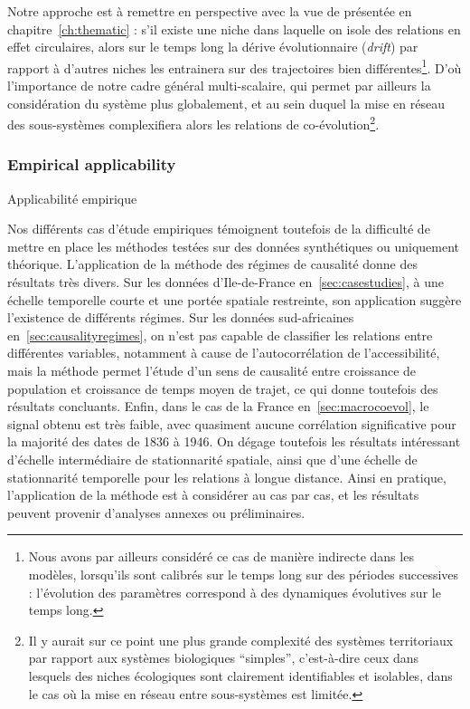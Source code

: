 Notre approche est à remettre en perspective avec la vue de  présentée en chapitre~\ref{ch:thematic} : s'il existe une niche dans laquelle on isole des relations en effet circulaires, alors sur le temps long la dérive évolutionnaire (\emph{drift}) par rapport à d'autres niches les entrainera sur des trajectoires bien différentes\footnote{Nous avons par ailleurs considéré ce cas de manière indirecte dans les modèles, lorsqu'ils sont calibrés sur le temps long sur des périodes successives : l'évolution des paramètres correspond à des dynamiques évolutives sur le temps long.}. D'où l'importance de notre cadre général multi-scalaire, qui permet par ailleurs la considération du système plus globalement, et au sein duquel la mise en réseau des sous-systèmes complexifiera alors les relations de co-évolution\footnote{Il y aurait sur ce point une plus grande complexité des systèmes territoriaux par rapport aux systèmes biologiques ``simples'', c'est-à-dire ceux dans lesquels des niches écologiques sont clairement identifiables et isolables, dans le cas où la mise en réseau entre sous-systèmes est limitée.}.





\subsubsection{Empirical applicability}{Applicabilité empirique}

Nos différents cas d'étude empiriques témoignent toutefois de la difficulté de mettre en place les méthodes testées sur des données synthétiques ou uniquement théorique. L'application de la méthode des régimes de causalité donne des résultats très divers. Sur les données d'Ile-de-France en~\ref{sec:casestudies}, à une échelle temporelle courte et une portée spatiale restreinte, son application suggère l'existence de différents régimes. Sur les données sud-africaines en~\ref{sec:causalityregimes}, on n'est pas capable de classifier les relations entre différentes variables, notamment à cause de l'autocorrélation de l'accessibilité, mais la méthode permet l'étude d'un sens de causalité entre croissance de population et croissance de temps moyen de trajet, ce qui donne toutefois des résultats concluants. Enfin, dans le cas de la France en~\ref{sec:macrocoevol}, le signal obtenu est très faible, avec quasiment aucune corrélation significative pour la majorité des dates de 1836 à 1946. On dégage toutefois les résultats intéressant d'échelle intermédiaire de stationnarité spatiale, ainsi que d'une échelle de stationnarité temporelle pour les relations à longue distance. Ainsi en pratique, l'application de la méthode est à considérer au cas par cas, et les résultats peuvent provenir d'analyses annexes ou préliminaires.



